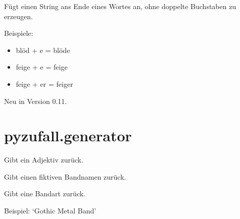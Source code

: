 \documentclass[a4paper,12pt,oneside]{sphinxmanual}
\begin{document}
\begin{fulllineitems}
\label{module:pyzufall.helfer.str_add}
Fügt einen String ans Ende eines Wortes an, ohne doppelte Buchstaben zu erzeugen.

Beispiele:
\begin{itemize}
\item {} 
blöd + e = blöde

\item {} 
feige + e = feige

\item {} 
feige + er = feiger

\end{itemize}
Neu in Version 0.11.
\end{fulllineitems}



\section{pyzufall.generator}
\label{module:pyzufall-generator}\label{module:module-pyzufall.generator}

\begin{fulllineitems}
\label{module:pyzufall.generator.adjektiv}
Gibt ein Adjektiv zurück.

\end{fulllineitems}


\begin{fulllineitems}
\label{module:pyzufall.generator.band}
Gibt einen fiktiven Bandnamen zurück.

\end{fulllineitems}


\begin{fulllineitems}
\label{module:pyzufall.generator.bandart}
Gibt eine Bandart zurück.

Beispiel: `Gothic Metal Band'

\end{fulllineitems}
\end{document}
